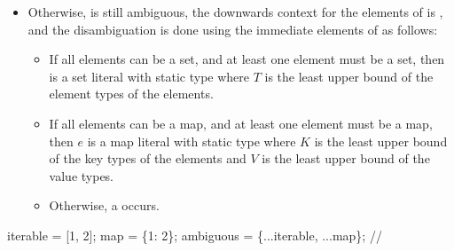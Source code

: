 \documentclass[makeidx]{article}
\begin{document}
{\begin{itemize}
  If $P_k$ is \FreeContext{} or $P$ is \FreeContext,
  the static key type of  is $K$
  where $K$ is the least upper bound of .
  Otherwise the static key type of  is $K$
  where $K$ is determined by downwards inference.

  If $P_v$ is \FreeContext{} or $P$ is \FreeContext,
  the static value type of  is $V$
  where $V$ is the least upper bound of .
  Otherwise the static value type of  is $V$
  where $V$ is determined by downwards inference.


  The static type of  is then .
\item
  Otherwise,  is still ambiguous,
  the downwards context for the elements of 
  is \FreeContext,
  and the disambiguation is done using
  the immediate elements of  as follows:

  \begin{itemize}
  \item
    If all elements can be a set,
    and at least one element must be a set,
    then  is a set literal with
    static type  where $T$ is
    the least upper bound of the element types of the elements.
  \item
    If all elements can be a map,
    and at least one element must be a map, then $e$ is
    a map literal with static type  where $K$ is
    the least upper bound of the key types of the elements and $V$ is
    the least upper bound of the value types.
  \item
    Otherwise, a  occurs.
  \end{itemize}
\end{itemize}


\begin{dartCode}
\VAR{} iterable = [1, 2];
\VAR{} map = \{1: 2\};
\VAR{} ambiguous = \{...iterable, ...map\}; // 
\end{dartCode}

}
\end{document}
